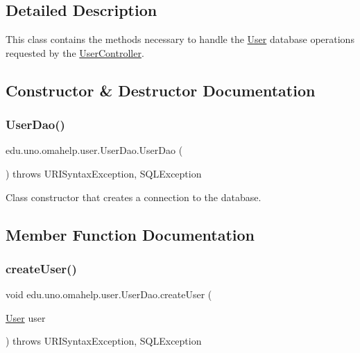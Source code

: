 \subsection{Detailed Description}
This class contains the methods necessary to handle the \mbox{\hyperlink{classedu_1_1uno_1_1omahelp_1_1user_1_1_user}{User}} database operations requested by the \mbox{\hyperlink{classedu_1_1uno_1_1omahelp_1_1user_1_1_user_controller}{User\+Controller}}. 

\subsection{Constructor \& Destructor Documentation}
\mbox{\label{classedu_1_1uno_1_1omahelp_1_1user_1_1_user_dao_a87fc1cbb3764e8b8acbc91c3eb444a68}} 
\subsubsection{\texorpdfstring{User\+Dao()}{UserDao()}}
{\footnotesize\ttfamily edu.\+uno.\+omahelp.\+user.\+User\+Dao.\+User\+Dao (\begin{DoxyParamCaption}{ }\end{DoxyParamCaption}) throws U\+R\+I\+Syntax\+Exception, S\+Q\+L\+Exception}

Class constructor that creates a connection to the database. 

\subsection{Member Function Documentation}
\mbox{\label{classedu_1_1uno_1_1omahelp_1_1user_1_1_user_dao_afb3c006e0b56953e04d238c8ecb97327}} 
\subsubsection{\texorpdfstring{create\+User()}{createUser()}}
{\footnotesize\ttfamily void edu.\+uno.\+omahelp.\+user.\+User\+Dao.\+create\+User (\begin{DoxyParamCaption}\item[{\mbox{\hyperlink{classedu_1_1uno_1_1omahelp_1_1user_1_1_user}{User}}}]{user }\end{DoxyParamCaption}) throws U\+R\+I\+Syntax\+Exception, S\+Q\+L\+Exception}

